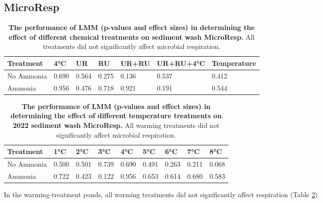 \subsection{MicroResp}\label{section:MRS}

\begin{table}[H]
    \caption{{\bf The performance of LMM (p-values and effect sizes) in determining the effect of different chemical treatments on sediment wash MicroResp.} All treatments did not significantly affect microbial respiration.}
    \centering
    \begin{tabular}{ m{2.5cm}<{\centering}m{1.5cm}<{\centering}m{1.5cm}<{\centering}m{1.5cm}<{\centering}m{1.5cm}<{\centering}m{2.2cm}<{\centering}m{2.2cm}<{\centering}}
    \toprule
    Treatment & 4°C & UR & RU & UR+RU & UR+RU+4°C & Temperature \\
     \midrule
    No Ammonia & 0.690 & 0.564 & 0.275 & 0.136 & 0.537 & 0.412 \\
    Ammonia & 0.956 & 0.476 & 0.718 & 0.921 & 0.191 & 0.544 \\
    \bottomrule
    \end{tabular}    
    \label{tab:MR_treat}
\end{table}

\begin{table}[H]
    \caption{{\bf The performance of LMM (p-values and effect sizes) in determining the effect of different temperature treatments on 2022 sediment wash MicroResp.} All warming treatments did not significantly affect microbial respiration.}
    \centering
    \begin{tabular}{ m{2.5cm}<{\centering}m{1.2cm}<{\centering}m{1.2cm}<{\centering}m{1.2cm}<{\centering}m{1.2cm}<{\centering}m{1.2cm}<{\centering}m{1.2cm}<{\centering}m{1.2cm}<{\centering}m{1.2cm}<{\centering}} 
    \toprule
    Treatment & 1°C & 2°C & 3°C & 4°C & 5°C & 6°C & 7°C & 8°C \\
     \midrule
    No Ammonia & 0.500 & 0.501 & 0.739 & 0.690 & 0.491 & 0.263 & 0.211 & 0.068 \\
    Ammonia & 0.722 & 0.423 & 0.122 & 0.956 & 0.653 & 0.614 & 0.680 & 0.583 \\
    \bottomrule
    \end{tabular}    
    \label{tab:MR_temp}
\end{table}

In the warming-treatment ponds, all warming treatments did not significantly affect respiration (Table \ref{tab:MR_temp}).

